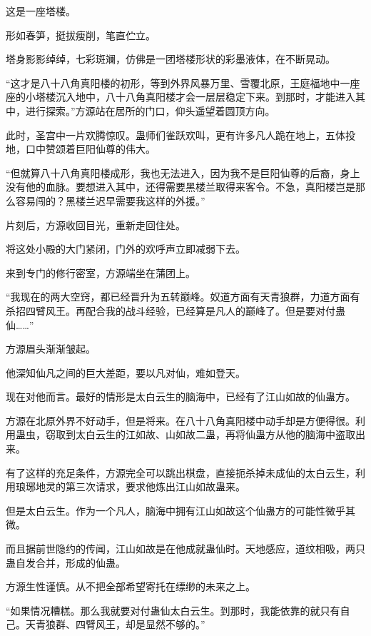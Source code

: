 
\begin{this_body}

这是一座塔楼。

形如春笋，挺拔瘦削，笔直伫立。

塔身影影绰绰，七彩斑斓，仿佛是一团塔楼形状的彩墨液体，在不断晃动。

“这才是八十八角真阳楼的初形，等到外界风暴万里、雪覆北原，王庭福地中一座座的小塔楼沉入地中，八十八角真阳楼才会一层层稳定下来。到那时，才能进入其中，进行探索。”方源站在居所的门口，仰头遥望着圆顶方向。

此时，圣宫中一片欢腾惊叹。蛊师们雀跃欢叫，更有许多凡人跪在地上，五体投地，口中赞颂着巨阳仙尊的伟大。

“但就算八十八角真阳楼成形，我也无法进入，因为我不是巨阳仙尊的后裔，身上没有他的血脉。要想进入其中，还得需要黑楼兰取得来客令。不急，真阳楼岂是那么容易闯的？黑楼兰迟早需要我这样的外援。”

片刻后，方源收回目光，重新走回住处。

将这处小殿的大门紧闭，门外的欢呼声立即减弱下去。

来到专门的修行密室，方源端坐在蒲团上。

“我现在的两大空窍，都已经晋升为五转巅峰。奴道方面有天青狼群，力道方面有杀招四臂风王。再配合我的战斗经验，已经算是凡人的巅峰了。但是要对付蛊仙……”

方源眉头渐渐皱起。

他深知仙凡之间的巨大差距，要以凡对仙，难如登天。

现在对他而言。最好的情形是太白云生的脑海中，已经有了江山如故的仙蛊方。

方源在北原外界不好动手，但是将来。在八十八角真阳楼中动手却是方便得很。利用蛊虫，窃取到太白云生的江如故、山如故二蛊，再将仙蛊方从他的脑海中盗取出来。

有了这样的充足条件，方源完全可以跳出棋盘，直接扼杀掉未成仙的太白云生，利用琅琊地灵的第三次请求，要求他炼出江山如故蛊来。

但是太白云生。作为一个凡人，脑海中拥有江山如故这个仙蛊方的可能性微乎其微。

而且据前世隐约的传闻，江山如故是在他成就蛊仙时。天地感应，道纹相吸，两只蛊自发合并，形成的仙蛊。

方源生性谨慎。从不把全部希望寄托在缥缈的未来之上。

“如果情况糟糕。那么我就要对付蛊仙太白云生。到那时，我能依靠的就只有自己。天青狼群、四臂风王，却是显然不够的。”


\end{this_body}
